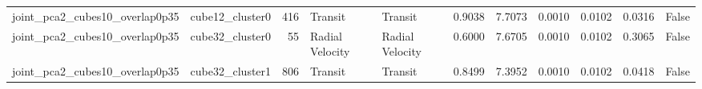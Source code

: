 \begin{table}[ht]
\begin{tabular}{llrllrrrrrr}
joint\_pca2\_cubes10\_overlap0p35 & cube12\_cluster0 & 416 & Transit & Transit & 0.9038 & 7.7073 & 0.0010 & 0.0102 & 0.0316 & False \\
joint\_pca2\_cubes10\_overlap0p35 & cube32\_cluster0 & 55 & Radial Velocity & Radial Velocity & 0.6000 & 7.6705 & 0.0010 & 0.0102 & 0.3065 & False \\
joint\_pca2\_cubes10\_overlap0p35 & cube32\_cluster1 & 806 & Transit & Transit & 0.8499 & 7.3952 & 0.0010 & 0.0102 & 0.0418 & False \\
\bottomrule
\end{tabular}

\end{table}
